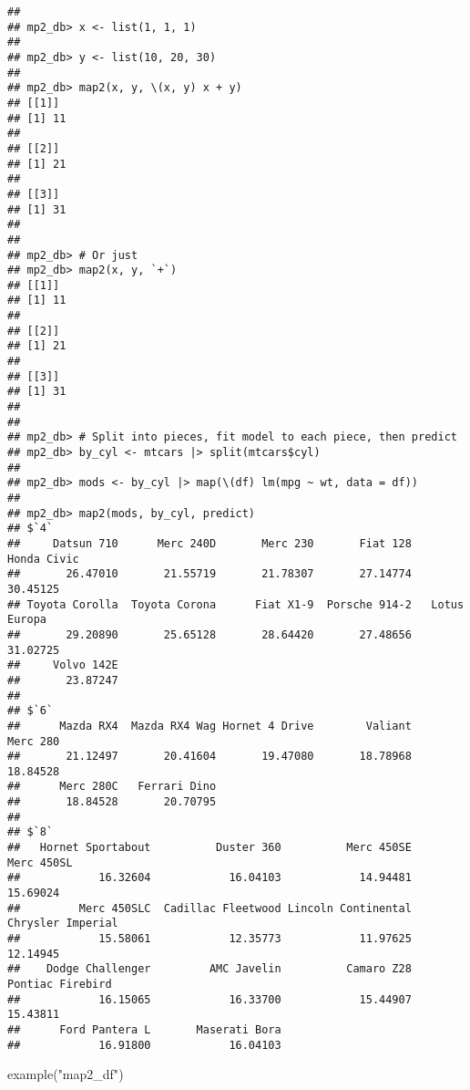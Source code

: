 \documentclass[
]{book}
\newenvironment{Shaded}{\begin{snugshade}}{\end{snugshade}}
\newcommand{\FunctionTok}[1]{\textcolor[rgb]{0.00,0.00,0.00}{#1}}
\newcommand{\NormalTok}[1]{#1}
\newcommand{\StringTok}[1]{\textcolor[rgb]{0.31,0.60,0.02}{#1}}
\begin{document}
\begin{verbatim}
## 
## mp2_db> x <- list(1, 1, 1)
## 
## mp2_db> y <- list(10, 20, 30)
## 
## mp2_db> map2(x, y, \(x, y) x + y)
## [[1]]
## [1] 11
## 
## [[2]]
## [1] 21
## 
## [[3]]
## [1] 31
## 
## 
## mp2_db> # Or just
## mp2_db> map2(x, y, `+`)
## [[1]]
## [1] 11
## 
## [[2]]
## [1] 21
## 
## [[3]]
## [1] 31
## 
## 
## mp2_db> # Split into pieces, fit model to each piece, then predict
## mp2_db> by_cyl <- mtcars |> split(mtcars$cyl)
## 
## mp2_db> mods <- by_cyl |> map(\(df) lm(mpg ~ wt, data = df))
## 
## mp2_db> map2(mods, by_cyl, predict)
## $`4`
##     Datsun 710      Merc 240D       Merc 230       Fiat 128    Honda Civic 
##       26.47010       21.55719       21.78307       27.14774       30.45125 
## Toyota Corolla  Toyota Corona      Fiat X1-9  Porsche 914-2   Lotus Europa 
##       29.20890       25.65128       28.64420       27.48656       31.02725 
##     Volvo 142E 
##       23.87247 
## 
## $`6`
##      Mazda RX4  Mazda RX4 Wag Hornet 4 Drive        Valiant       Merc 280 
##       21.12497       20.41604       19.47080       18.78968       18.84528 
##      Merc 280C   Ferrari Dino 
##       18.84528       20.70795 
## 
## $`8`
##   Hornet Sportabout          Duster 360          Merc 450SE          Merc 450SL 
##            16.32604            16.04103            14.94481            15.69024 
##         Merc 450SLC  Cadillac Fleetwood Lincoln Continental   Chrysler Imperial 
##            15.58061            12.35773            11.97625            12.14945 
##    Dodge Challenger         AMC Javelin          Camaro Z28    Pontiac Firebird 
##            16.15065            16.33700            15.44907            15.43811 
##      Ford Pantera L       Maserati Bora 
##            16.91800            16.04103
\end{verbatim}

\begin{Shaded}
\begin{Highlighting}[]
\FunctionTok{example}\NormalTok{(}\StringTok{"map2\_df"}\NormalTok{)}
\end{Highlighting}
\end{Shaded}
\end{document}
